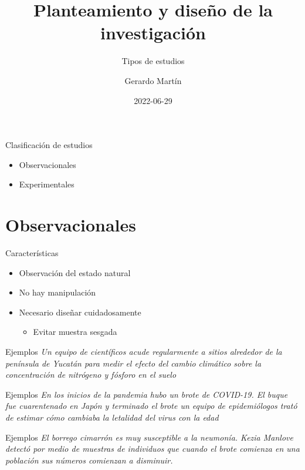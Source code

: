 \documentclass[
  11pt,
  ignorenonframetext,
]{beamer}
\title{Planteamiento y diseño de la investigación}
\subtitle{Tipos de estudios}
\author{Gerardo Martín}
\date{2022-06-29}
\providecommand{\tightlist}{%
  \setlength{\itemsep}{0pt}\setlength{\parskip}{0pt}}
\begin{document}
\frame{\titlepage}

\begin{frame}{Clasificación de estudios}
\protect\hypertarget{clasificaciuxf3n-de-estudios}{}
\begin{itemize}
\item
  Observacionales
\item
  Experimentales
\end{itemize}
\end{frame}

\hypertarget{observacionales}{%
\section{Observacionales}\label{observacionales}}

\begin{frame}{Características}
\protect\hypertarget{caracteruxedsticas}{}
\begin{itemize}
\item
  Observación del estado natural
\item
  No hay manipulación
\item
  Necesario diseñar cuidadosamente

  \begin{itemize}
  \tightlist
  \item
    Evitar muestra sesgada
  \end{itemize}
\end{itemize}
\end{frame}

\begin{frame}{Ejemplos}
\protect\hypertarget{ejemplos}{}
\emph{Un equipo de científicos acude regularmente a sitios alrededor de
la península de Yucatán para medir el efecto del cambio climático sobre
la concentración de nitrógeno y fósforo en el suelo}
\end{frame}

\begin{frame}{Ejemplos}
\protect\hypertarget{ejemplos-1}{}
\emph{En los inicios de la pandemia hubo un brote de COVID-19. El buque
fue cuarentenado en Japón y terminado el brote un equipo de
epidemiólogos trató de estimar cómo cambiaba la letalidad del virus con
la edad}
\end{frame}

\begin{frame}{Ejemplos}
\protect\hypertarget{ejemplos-2}{}
\emph{El borrego cimarrón es muy susceptible a la neumonía. Kezia
Manlove detectó por medio de muestras de individuos que cuando el brote
comienza en una población sus números comienzan a disminuir.}
\end{frame}
\end{document}

